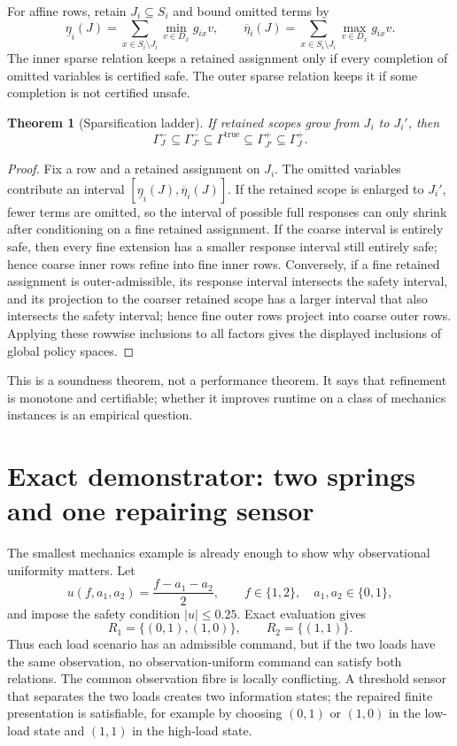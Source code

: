 \documentclass[11pt]{article}
\theoremstyle{plain}
\newtheorem{theorem}{Theorem}[section]
\theoremstyle{definition}
\theoremstyle{remark}
\begin{document}
For affine rows, retain \(J_i\subseteq S_i\) and bound omitted terms by
\[
\underline\eta_i(J)=
\sum_{x\in S_i\setminus J_i}\min_{v\in D_x}g_{ix}v,
\qquad
\overline\eta_i(J)=
\sum_{x\in S_i\setminus J_i}\max_{v\in D_x}g_{ix}v.
\]
The inner sparse relation keeps a retained assignment only if every completion
of omitted variables is certified safe.  The outer sparse relation keeps it if
some completion is not certified unsafe.

\begin{theorem}[Sparsification ladder]
If retained scopes grow from \(J_i\) to \(J_i'\), then
\[
  \Gamma^-_J
  \subseteq
  \Gamma^-_{J'}
  \subseteq
  \Gamma^{\mathrm{true}}
  \subseteq
  \Gamma^+_{J'}
  \subseteq
  \Gamma^+_J.
\]
\end{theorem}

\begin{proof}
Fix a row and a retained assignment on \(J_i\).  The omitted variables contribute
an interval \([\underline\eta_i(J),\overline\eta_i(J)]\).  If the retained scope
is enlarged to \(J_i'\), fewer terms are omitted, so the interval of possible
full responses can only shrink after conditioning on a fine retained assignment.
If the coarse interval is entirely safe, then every fine extension has a smaller
response interval still entirely safe; hence coarse inner rows refine into fine
inner rows.  Conversely, if a fine retained assignment is outer-admissible, its
response interval intersects the safety interval, and its projection to the
coarser retained scope has a larger interval that also intersects the safety
interval; hence fine outer rows project into coarse outer rows.  Applying these
rowwise inclusions to all factors gives the displayed inclusions of global
policy spaces.
\end{proof}

This is a soundness theorem, not a performance theorem.  It says that refinement
is monotone and certifiable; whether it improves runtime on a class of mechanics
instances is an empirical question.

\section{Exact demonstrator: two springs and one repairing sensor}
\label{sec:two-spring}

The smallest mechanics example is already enough to show why observational
uniformity matters.  Let
\[
  u(f,a_1,a_2)=\frac{f-a_1-a_2}{2},
  \qquad f\in\{1,2\},\quad a_1,a_2\in\{0,1\},
\]
and impose the safety condition \(|u|\le 0.25\).  Exact evaluation gives
\[
  R_1=\{(0,1),(1,0)\},
  \qquad
  R_2=\{(1,1)\}.
\]
Thus each load scenario has an admissible command, but if the two loads have the
same observation, no observation-uniform command can satisfy both relations.
The common observation fibre is locally conflicting.  A threshold sensor that
separates the two loads creates two information states; the repaired finite
presentation is satisfiable, for example by choosing \((0,1)\) or \((1,0)\) in
the low-load state and \((1,1)\) in the high-load state.
\end{document}
